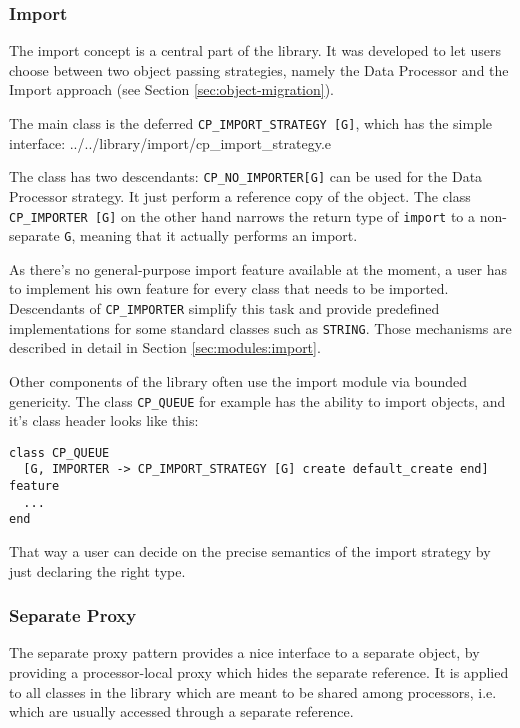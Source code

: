 \documentclass[a4paper,10pt]{article}
\begin{document}
\subsubsection{Import}
\label{sec:concepts:import}

The import concept is a central part of the library.
It was developed to let users choose between two object passing strategies, namely the Data Processor and the Import approach (see Section \ref{sec:object-migration}).

The main class is the deferred \lstinline!CP_IMPORT_STRATEGY [G]!, which has the simple interface:
 {../../library/import/cp_import_strategy.e}

The class has two descendants: \lstinline!CP_NO_IMPORTER[G]! can be used for the Data Processor strategy. 
It just perform a reference copy of the object.
The class \lstinline!CP_IMPORTER [G]! on the other hand narrows the return type of \lstinline!import! to a non-separate \lstinline!G!, meaning that it actually performs an import.

As there's no general-purpose import feature available at the moment, a user has to implement his own feature for every class that needs to be imported.
Descendants of \lstinline!CP_IMPORTER! simplify this task and provide predefined implementations for some standard classes such as \lstinline!STRING!.
Those mechanisms are described in detail in Section \ref{sec:modules:import}.

Other components of the library often use the import module via bounded genericity.
The class \lstinline!CP_QUEUE! for example has the ability to import objects, and it's class header looks like this:
\begin{lstlisting}
class CP_QUEUE
  [G, IMPORTER -> CP_IMPORT_STRATEGY [G] create default_create end]
feature
  ...
end
\end{lstlisting}
That way a user can decide on the precise semantics of the import strategy by just declaring the right type.



\subsubsection{Separate Proxy}

The separate proxy pattern provides a nice interface to a separate object, by providing a processor-local proxy which hides the separate reference.
It is applied to all classes in the library which are meant to be shared among processors, i.e. which are usually accessed through a separate reference.
\end{document}
